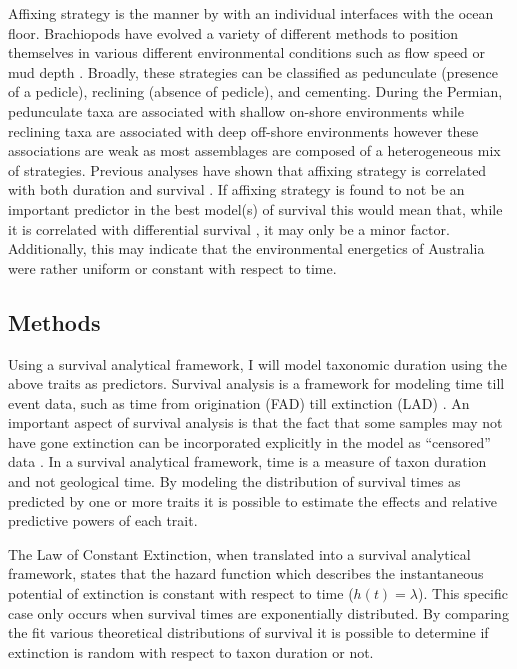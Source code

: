 \documentclass[12pt,letterpaper]{article}
\begin{document}
Affixing strategy is the manner by with an individual interfaces with the ocean floor. Brachiopods have evolved a variety of different methods to position themselves in various different environmental conditions such as flow speed or mud depth \citep{Rudwick1970,Alexander1977,LaBarbera1978,LaBarbera1981,Richardson1997}. Broadly, these strategies can be classified as pedunculate (presence of a pedicle), reclining (absence of pedicle), and cementing. During the Permian, pedunculate taxa are associated with shallow on-shore environments while reclining taxa are associated with deep off-shore environments \citep{Clapham2007} however these associations are weak as most assemblages are composed of a heterogeneous mix of strategies. Previous analyses have shown that affixing strategy is correlated with both duration and survival \citep{Alexander1977,Johansen1989}. If affixing strategy is found to not be an important predictor in the best model(s) of survival this would mean that, while it is correlated with differential survival \citep{Alexander1977,Johansen1989}, it may only be a minor factor. Additionally, this may indicate that the environmental energetics of Australia were rather uniform or constant with respect to time.

\subsection{Methods}
Using a survival analytical framework, I will model taxonomic duration using the above traits as predictors. Survival analysis is a framework for modeling time till event data, such as time from origination (FAD) till extinction (LAD) \citep{Kleinbaum2005,Simpson1944,VanValen1973}. An important aspect of survival analysis is that the fact that some samples may not have gone extinction can be incorporated explicitly in the model as ``censored'' data \citep{Kleinbaum2005}. In a survival analytical framework, time is a measure of taxon duration and not geological time. By modeling the distribution of survival times as predicted by one or more traits it is possible to estimate the effects and relative predictive powers of each trait.

The Law of Constant Extinction, when translated into a survival analytical framework, states that the hazard function which describes the instantaneous potential of extinction is constant with respect to time (\(h(t) = \lambda\)). This specific case only occurs when survival times are exponentially distributed. By comparing the fit various theoretical distributions of survival it is possible to determine if extinction is random with respect to taxon duration or not. 
\end{document}
